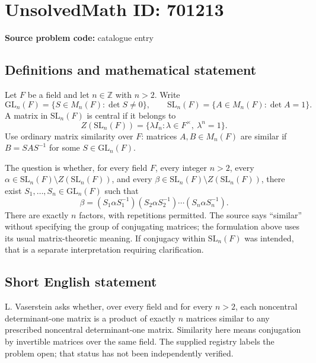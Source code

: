 \documentclass[11pt]{article}
\newcommand{\Z}{\mathbb{Z}}
\begin{document}
\section*{UnsolvedMath ID: 701213}
\textbf{Source problem code:} catalogue entry
\subsection{Definitions and mathematical statement}
Let \(F\) be a field and let \(n\in\Z\) with \(n>2\). Write
\[
\mathrm{GL}_n(F)=\{S\in M_n(F):\det S\ne0\},\qquad
\mathrm{SL}_n(F)=\{A\in M_n(F):\det A=1\}.
\]
A matrix in \(\mathrm{SL}_n(F)\) is central if it belongs to
\[
Z(\mathrm{SL}_n(F))=\{\lambda I_n:\lambda\in F^{\times},\ \lambda^n=1\}.
\]
Use ordinary matrix similarity over \(F\): matrices \(A,B\in M_n(F)\) are similar if \(B=SAS^{-1}\) for some \(S\in\mathrm{GL}_n(F)\).

The question is whether, for every field \(F\), every integer \(n>2\), every \(\alpha\in\mathrm{SL}_n(F)\setminus Z(\mathrm{SL}_n(F))\), and every \(\beta\in\mathrm{SL}_n(F)\setminus Z(\mathrm{SL}_n(F))\), there exist \(S_1,\ldots,S_n\in\mathrm{GL}_n(F)\) such that
\[
\beta=(S_1\alpha S_1^{-1})(S_2\alpha S_2^{-1})\cdots(S_n\alpha S_n^{-1}).
\]
There are exactly \(n\) factors, with repetitions permitted. The source says ``similar'' without specifying the group of conjugating matrices; the formulation above uses its usual matrix-theoretic meaning. If conjugacy within \(\mathrm{SL}_n(F)\) was intended, that is a separate interpretation requiring clarification.
\subsection{Short English statement}
L. Vaserstein asks whether, over every field and for every \(n>2\), each noncentral determinant-one matrix is a product of exactly \(n\) matrices similar to any prescribed noncentral determinant-one matrix. Similarity here means conjugation by invertible matrices over the same field. The supplied registry labels the problem open; that status has not been independently verified.
\end{document}
